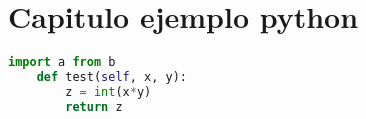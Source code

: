 \chapter{Capitulo ejemplo python}

\begin{lstlisting}[language=python]
	import a from b
	def test(self, x, y):
		z = int(x*y)
		return z
\end{lstlisting}
